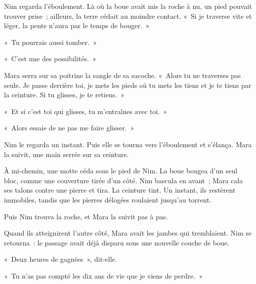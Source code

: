 \documentclass[10pt,a4paper]{article}
\begin{document}
Nim regarda l’éboulement. Là où la boue avait mis la roche à nu, un pied pouvait trouver prise~; ailleurs, la terre cédait au moindre contact. «~Si je traverse vite et léger, la pente n’aura pas le temps de bouger.~»

«~Tu pourrais aussi tomber.~»

«~C’est une des possibilités.~»

Mara serra sur sa poitrine la sangle de sa sacoche. «~Alors tu ne traverses pas seule. Je passe derrière toi, je mets les pieds où tu mets les tiens et je te tiens par la ceinture. Si tu glisses, je te retiens.~»

«~Et si c’est toi qui glisses, tu m’entraînes avec toi.~»

«~Alors essaie de ne pas me faire glisser.~»

Nim le regarda un instant. Puis elle se tourna vers l’éboulement et s’élança. Mara la suivit, une main serrée sur sa ceinture.

À mi-chemin, une motte céda sous le pied de Nim. La boue bougea d’un seul bloc, comme une couverture tirée d’un côté. Nim bascula en avant~; Mara cala ses talons contre une pierre et tira. La ceinture tint. Un instant, ils restèrent immobiles, tandis que les pierres délogées roulaient jusqu’au torrent.

Puis Nim trouva la roche, et Mara la suivit pas à pas.

Quand ils atteignirent l’autre côté, Mara avait les jambes qui tremblaient. Nim se retourna~: le passage avait déjà disparu sous une nouvelle couche de boue.

«~Deux heures de gagnées~», dit-elle.

«~Tu n’as pas compté les dix ans de vie que je viens de perdre.~»
\end{document}
